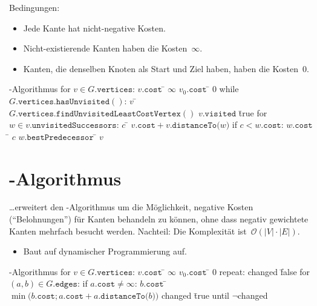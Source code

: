 Bedingungen:
\begin{itemize}
  \item Jede Kante hat nicht-negative Kosten.
  \item Nicht-existierende Kanten haben die Kosten~$\infty$.
  \item Kanten, die denselben Knoten als Start und Ziel haben, haben die Kosten~0.
\end{itemize}

\begin{mathalgo}{\protect{}-Algorithmus}
for $v \in G\mathtt{.vertices}$:
\> $v\mathtt{.cost}$ \= $\infty$
$v_0\mathtt{.cost}$ \= $0$
while $G\mathtt{.vertices.hasUnvisited()}$:
\> 
\> $v$ \= $G\mathtt{.vertices.findUnvisitedLeastCostVertex()}$
\> $v\mathtt{.visited}$ \= true
\> for $w \in v\mathtt{.unvisitedSuccessors}$:
\>\> 
\>\> $c$ \= $v\mathtt{.cost} + v\mathtt{.distanceTo(}w\mathtt{)}$
\>\> if $c < w\mathtt{.cost}$:
\>\>\> $w\mathtt{.cost}$ \= $c$
\>\>\> $w\mathtt{.bestPredecessor}$ \= $v$
\end{mathalgo}

\section{\protect{}-Algorithmus}
\ldots erweitert den -Algorithmus um die Möglichkeit, negative Kosten (\enquote{Belohnungen}) für Kanten behandeln zu können, ohne dass negativ gewichtete Kanten mehrfach besucht werden.
Nachteil: Die Komplexität ist~$\mathcal{O}(\lvert V \rvert \cdot \lvert E \rvert)$.
\begin{itemize}
  \item Baut auf dynamischer Programmierung auf.
\end{itemize}
\begin{mathalgo}{\protect{}-Algorithmus}
for $v \in G\mathtt{.vertices}$:
\> $v\mathtt{.cost}$ \= $\infty$
$v_0\mathtt{.cost}$ \= $0$
repeat:
\> changed \= false
\> for $(a,b) \in G\mathtt{.edges}$:
\>\> 
\>\> if $a\mathtt{.cost} \neq \infty$:
\>\>\> $b\mathtt{.cost}$ \= $\min\bigl( b\mathtt{.cost}; a\mathtt{.cost} + a\mathtt{.distanceTo(}b\mathtt{)} \bigr)$
\>\>\> changed \= true
until $\neg$changed
\end{mathalgo}

